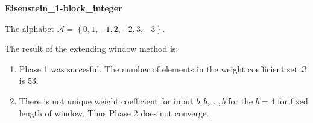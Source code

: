 \begin{exmp}
\textbf{ Eisenstein\_1-block\_integer }

\label{ex:Eisenstein1-blockinteger}

The alphabet $\mathcal{A} =\left\{0, 1, -1, 2, -2, 3, -3\right\}$.

The result of the extending window method is:
\begin{enumerate}
    \item Phase 1 was succesful.
The number of elements in the weight coefficient set $\mathcal{Q}$ is $53$.

    \item There is not unique weight coefficient for input $b,b,\dots,b$ for the $b= 4 $ for fixed length of window. Thus Phase 2 does not converge.

\end{enumerate}
\end{exmp}
